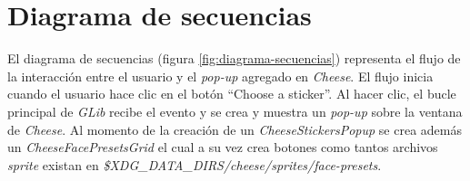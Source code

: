 \documentclass[a4paper,openright,12pt]{report}
\begin{document}

\section{Diagrama de secuencias}
El diagrama de secuencias (figura \ref{fig:diagrama-secuencias}) representa el
flujo de la interacción entre el usuario y el \textit{pop-up} agregado en
\textit{Cheese}. El flujo inicia cuando el usuario hace clic en el botón
``Choose a sticker''. Al hacer clic, el bucle principal de \textit{GLib} recibe
el evento y se crea y muestra un \textit{pop-up} sobre la ventana de
\textit{Cheese}. Al momento de la creación de un \textit{CheeseStickersPopup}
se crea además un \textit{CheeseFacePresetsGrid} el cual a su vez crea botones
como tantos archivos \textit{sprite} existan en
\textit{\$XDG\_DATA\_DIRS/cheese/sprites/face-presets}.\\
\end{document}
